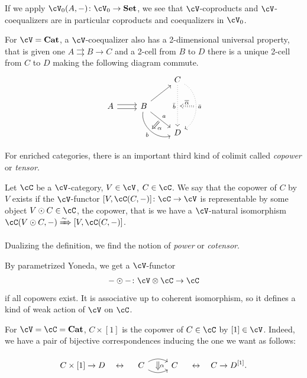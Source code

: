 \documentclass[a4paper,11pt,oneside,openany]{scrbook}
\begin{document}
\begin{rmk}
    If we apply $\cV_0(A,-)\colon\cV_0\rightarrow\Set$, we see that $\cV$-coproducts and $\cV$-coequalizers are in particular coproducts and coequalizers in $\cV_0$.
\end{rmk}

\begin{exmp}
    For $\cV=\Cat$, a $\cV$-coequalizer also has a 2-dimensional universal property, that is given one $A\rightrightarrows B\rightarrow C$ and a 2-cell from $B$ to $D$ there is a unique 2-cell from $C$ to $D$ making the following diagram commute.
    \[
    \begin{tikzcd}
    	&& C\ar[dd, dotted, swap, "\bar{b}", ""{name=bbar}]\ar[dd, dotted, bend left=60, "\bar{a}", ""{name=abar}] \\
        A\ar[r, shift left,]\ar[r, shift right]
        & B\ar[ur]\ar[dr, "a", ""{name=a}]\ar[dr, bend right=60, swap, "b", ""{name=b}] \\
        && D
        \ar[Rightarrow, shorten <= .3em, shorten >= .3em, from=a, to=b, "\alpha"]
        \ar[Rightarrow, dotted, shorten <= .3em, shorten >= .3em, swap, from=abar, to=bbar, "\overline{\alpha}"]
    \end{tikzcd}
    \]
\end{exmp}

For enriched categories, there is an important third kind of colimit called \emph{copower} or \emph{tensor}.

\begin{defn}
    Let $\cC$ be a $\cV$-category, $V\in\cV$, $C\in\cC$. We say that the copower of $C$ by $V$ exists if the $\cV$-functor $[V,\cC(C,-)]\colon\cC\rightarrow\cV$ is representable by some object $V\odot C\in\cC$, the copower, that is we have a $\cV$-natural isomorphism $\cC(V\odot C,-)\xRightarrow{\sim}[V,\cC(C,-)]$.
    
    Dualizing the definition, we find the notion of \emph{power} or \emph{cotensor}.
\end{defn}

\begin{rmk}
    By parametrized Yoneda, we get a $\cV$-functor$$-\odot-\colon\cV\otimes\cC\rightarrow\cC$$if all copowers exist. It is associative up to coherent isomorphism, so it defines a kind of weak action of $\cV$ on $\cC$.
\end{rmk}

\begin{exmp}
    For $\cV=\cC=\Cat$, $C\times[1]$ is the copower of $C\in\cC$ by $[1]\in\cV$. Indeed, we have a pair of bijective correspondences inducing the one we want as follows:
    
    $$C\times[1]\rightarrow D\quad\leftrightarrow\quad
        \begin{tikzcd}
        C\ar[r, bend left, ""{name=A}]\ar[r, bend right, swap, ""{name=B}]
        & C
        \ar[Rightarrow, shorten <= .3em, shorten >= .3em, from=A, to=B, "\alpha"]
    \end{tikzcd}
    \quad\leftrightarrow\quad C\rightarrow D^{[1]}.$$
\end{exmp}
\end{document}
